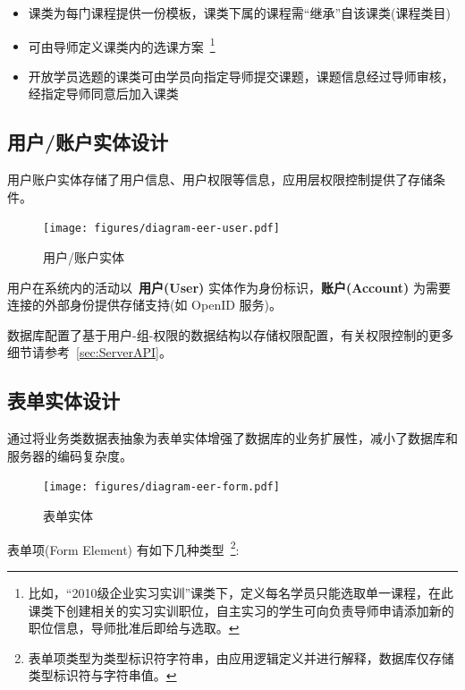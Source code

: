 \begin{itemize}
  \item 课类为每门课程提供一份模板，课类下属的课程需“继承”自该课类(课程类目)
  \item 可由导师定义课类内的选课方案~\footnote{比如，“2010级企业实习实训”课类下，定义每名学员只能选取单一课程，在此课类下创建相关的实习实训职位，自主实习的学生可向负责导师申请添加新的职位信息，导师批准后即给与选取。}
  \item 开放学员选题的课类可由学员向指定导师提交课题，课题信息经过导师审核，经指定导师同意后加入课类
\end{itemize}

\newpage

\subsection{用户/账户实体设计}

用户账户实体存储了用户信息、用户权限等信息，应用层权限控制提供了存储条件。

\begin{figure}[!h]
  \begin{center}
    \texttt{[image: figures/diagram-eer-user.pdf]}
    \caption{用户/账户实体\label{DatabaseEntityUser}}
  \end{center}
\end{figure}

用户在系统内的活动以~\textbf{用户(User)} 实体作为身份标识，\textbf{账户(Account)} 为需要连接的外部身份提供存储支持(如 OpenID 服务)。

数据库配置了基于用户-组-权限的数据结构以存储权限配置，有关权限控制的更多细节请参考~\ref{sec:ServerAPI}。

\newpage

\subsection{表单实体设计}

通过将业务类数据表抽象为表单实体增强了数据库的业务扩展性，减小了数据库和服务器的编码复杂度。

\begin{figure}[!h]
  \begin{center}
    \texttt{[image: figures/diagram-eer-form.pdf]}
    \caption{表单实体\label{DatabaseEntityForm}}
  \end{center}
\end{figure}

表单项(Form Element) 有如下几种类型~\footnote{表单项类型为类型标识符字符串，由应用逻辑定义并进行解释，数据库仅存储类型标识符与字符串值。}:

